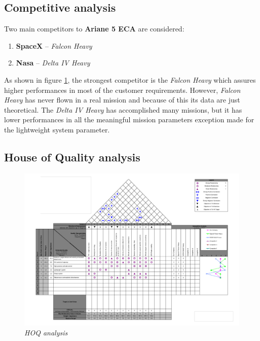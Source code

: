 \documentclass[12pt,fleqn,openany]{book} %
\begin{document}
\subsection{Competitive analysis}
Two main competitors to \textbf{Ariane 5 ECA} are considered:
\begin{enumerate}
 \item \textbf{SpaceX} – \textit{Falcon Heavy}
 \item \textbf{Nasa} – \textit{Delta IV Heavy}
\end{enumerate}
As shown in figure \hypertarget{fig:hoq}{\ref{fig:hoq}}, the strongest competitor is the \textit{Falcon Heavy} which assures higher performances in most of the customer requirements. However, \textit{Falcon Heavy} has never flown in a real mission and because of this its data are just theoretical. The \textit{Delta IV Heavy} has accomplished many missions, but it has lower performances in all the meaningful mission parameters exception made for the lightweight system parameter.
\newpage
\subsection{House of Quality analysis}
\begin{figure}[h]
 \centering
 \includegraphics[width=1.2\textwidth,angle=270]{hoq}
 \caption{\emph{HOQ analysis}}
 \label{fig:hoq}
\end{figure}
\end{document}
